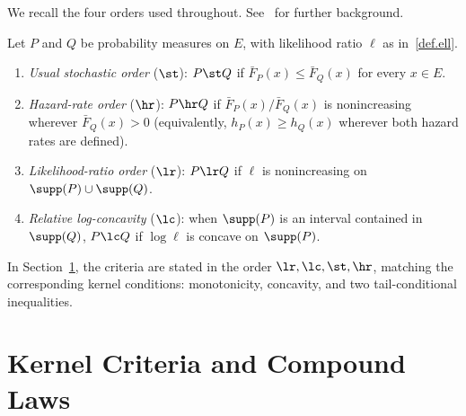 \documentclass[11pt]{article}
\begin{document}
We recall the four orders used throughout. See~\cite{ShakedShanthikumar,Whitt1985} for further background.

\begin{defn}\label{def:orders}
Let \(P\) and \(Q\) be probability measures on \(E\), with likelihood ratio \(\ell\) as in~\eqref{def.ell}.
\begin{enumerate}[label=\textup{(\roman*)}]

\item \emph{Usual stochastic order} ($\st$): \(P\st Q\) if
\(\bar F_P(x)\le\bar F_Q(x)\) for every \(x\in E\).

\item \emph{Hazard-rate order} ($\hr$): \(P\hr Q\) if \(\bar F_P(x)/\bar F_Q(x)\) is nonincreasing wherever \(\bar F_Q(x)>0\) (equivalently, \(h_P(x)\ge h_Q(x)\) wherever both hazard rates are defined).

\item \emph{Likelihood-ratio order} ($\lr$): \(P\lr Q\) if \(\ell\) is nonincreasing on \(\supp(P)\cup\supp(Q)\).

\item \emph{Relative log-concavity} ($\lc$): when \(\supp(P)\) is an interval contained in \(\supp(Q)\), \(P\lc Q\) if \(\log\ell\) is concave on \(\supp(P)\).
\end{enumerate}
\end{defn}

In Section~\ref{sec:kernel}, the criteria are stated in the order \(\lr,\lc,\st,\hr\), matching the corresponding kernel conditions: monotonicity, concavity, and two tail-conditional inequalities.












\section{Kernel Criteria and Compound Laws}
\label{sec:kernel}
\end{document}
